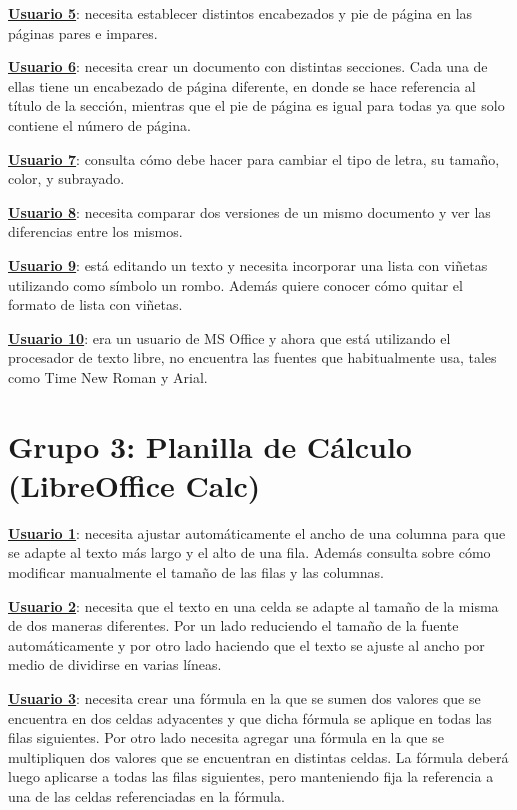 \documentclass[12pt]{article}
\begin{document}
\textbf{\underline{Usuario 5}}: necesita establecer distintos encabezados y pie de página en las páginas pares e impares.

\textbf{\underline{Usuario 6}}: necesita crear un documento con distintas secciones. Cada una de ellas tiene un encabezado de página diferente, en donde se hace referencia al título de la sección, mientras que el pie de página es igual para todas ya que solo contiene el número de página. 

\textbf{\underline{Usuario 7}}: consulta cómo debe hacer para cambiar el tipo de letra, su tamaño, color, y subrayado.

\textbf{\underline{Usuario 8}}: necesita comparar dos versiones de un mismo documento y ver las diferencias entre los mismos. 

\textbf{\underline{Usuario 9}}: está editando un texto y necesita incorporar una lista con viñetas utilizando como símbolo un rombo. Además quiere conocer cómo quitar el formato de lista con viñetas.

\textbf{\underline{Usuario 10}}: era un usuario de MS Office y ahora que está utilizando el procesador de texto libre, no encuentra las fuentes que habitualmente usa, tales como Time New Roman y Arial.

\section*{\textbf{Grupo 3: Planilla de Cálculo (LibreOffice Calc)}}

\textbf{\underline{Usuario 1}}: necesita ajustar automáticamente el ancho de una columna para que se adapte al texto más largo y el alto de una fila. Además consulta sobre cómo modificar manualmente el tamaño de las filas y las columnas.

\textbf{\underline{Usuario 2}}: necesita que el texto en una celda se adapte al tamaño de la misma de dos maneras diferentes. Por un lado reduciendo el tamaño de la fuente automáticamente y por otro lado haciendo que el texto se ajuste al ancho por medio de dividirse en varias líneas.

\textbf{\underline{Usuario 3}}: necesita crear una fórmula en la que se sumen dos valores que se encuentra en dos celdas adyacentes y que dicha fórmula se aplique en todas las filas siguientes. Por otro lado necesita agregar una fórmula en la que se multipliquen dos valores que se encuentran en distintas celdas. La fórmula deberá luego aplicarse a todas las filas siguientes, pero manteniendo fija la referencia a una de las celdas referenciadas en la fórmula.
\end{document}
